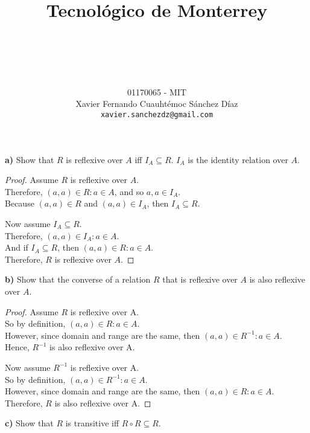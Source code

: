 \documentclass[titlepage, letterpaper, fleqn]{article}
\title{
\vspace{1in}
\textbf{Tecnológico de Monterrey} \\
\vspace{0.5in}
\textmd{\mahclass} \\
\large{\textit{\mahteacher}} \\
\vspace{0.5in}
\textsc{\mahtitle}
\author{01170065  - MIT \\
Xavier Fernando Cuauhtémoc Sánchez Díaz \\
\texttt{xavier.sanchezdz@gmail.com}}
\date{\mahdate}
}
\newcommand{\spacepls}{\vspace{5mm}}
\begin{document}
\begin{titlepage}
\maketitle
\end{titlepage}

%
%

{\large \textbf{a)} Show that \(R\) is reflexive over \(A\) iff \(I_A \subseteq R\).
\(I_A\) is the identity relation over \(A\).}

\begin{proof}
Assume \(R\) is reflexive over \(A\).\\
Therefore, \((a,a) \in R : a \in A\), and so \(a,a \in I_A\).\\
Because \((a,a) \in R\) and \((a,a) \in I_A\), then \(I_A \subseteq R\).

\spacepls

Now assume \(I_A \subseteq R\).\\
Therefore, \((a,a) \in I_A : a \in A\).\\
And if \(I_A \subseteq R\), then \((a,a) \in R : a \in A\).\\
Therefore, \(R\) is reflexive over \(A\).
\end{proof}

\spacepls

{\large \textbf{b)} Show that the converse of a relation \(R\) that is reflexive over \(A\) is also reflexive over \(A\).}

\begin{proof}
Assume \(R\) is reflexive over A.\\
So by definition, \((a,a) \in R : a \in A\).\\
However, since domain and range are the same, then \((a,a) \in R^{-1} : a \in A\).\\
Hence, \(R^{-1}\) is also reflexive over A.

\spacepls

Now assume \(R^{-1}\) is reflexive over A.\\
So by definition, \((a,a) \in R^{-1} : a \in A\).\\
However, since domain and range are the same, then \((a,a) \in R : a \in A\).\\
Therefore, \(R\) is also reflexive over A.
\end{proof}

\spacepls

{\large \textbf{c)} Show that \(R\) is transitive iff \(R \circ R \subseteq R\)}.
\end{document}
